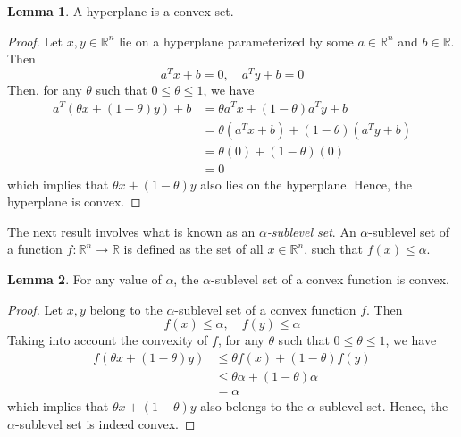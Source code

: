 \documentclass[a4paper]{article}
\theoremstyle{definition}
\newtheorem{lemma}{Lemma}[subsection]
\begin{document}
\begin{lemma}
	\label{hyperplane-convex}
	A hyperplane is a convex set.
\end{lemma}
\begin{proof}
	Let $x, y \in \mathbb{R}^n$ lie on a hyperplane parameterized by some $a \in \mathbb{R}^n$ and $b \in \mathbb{R}$.
	Then
	\begin{equation*}
		a^T x + b = 0, \quad a^T y + b = 0
	\end{equation*}
	Then, for any $\theta$ such that $0 \leq \theta \leq 1$, we have
	\begin{align*}
		a^T (\theta x + (1 - \theta) y) + b & = \theta a^T x + (1 - \theta) a^T y + b \\
		& = \theta (a^T x + b) + (1 - \theta) (a^T y + b) \\
		& = \theta (0) + (1 - \theta) (0) \\
		& = 0
	\end{align*}
	which implies that $\theta x + (1 - \theta) y$ also lies on the hyperplane.
	Hence, the hyperplane is convex.
\end{proof}

The next result involves what is known as an $\alpha$\textit{-sublevel set}.
An $\alpha$-sublevel set of a function $f : \mathbb{R}^n \rightarrow \mathbb{R}$ is defined as the set of all $x \in \mathbb{R}^n$, such that $f(x) \leq \alpha$.
\begin{lemma}
	\label{sublevel-convex}
	For any value of $\alpha$, the $\alpha$-sublevel set of a convex function is convex.
\end{lemma}
\begin{proof}
	Let $x, y$ belong to the $\alpha$-sublevel set of a convex function $f$.
	Then
	\begin{equation*}
		f(x) \leq \alpha, \quad f(y) \leq \alpha
	\end{equation*}
	Taking into account the convexity of $f$, for any $\theta$ such that $0 \leq \theta \leq 1$, we have
	\begin{align*}
		f(\theta x + (1 - \theta)y) & \leq \theta f(x) + (1 - \theta) f(y) \\
		& \leq \theta \alpha + (1 - \theta) \alpha \\
		& = \alpha
	\end{align*}
	which implies that $\theta x + (1 - \theta) y$ also belongs to the $\alpha$-sublevel set.
	Hence, the $\alpha$-sublevel set is indeed convex.
\end{proof}
\end{document}
